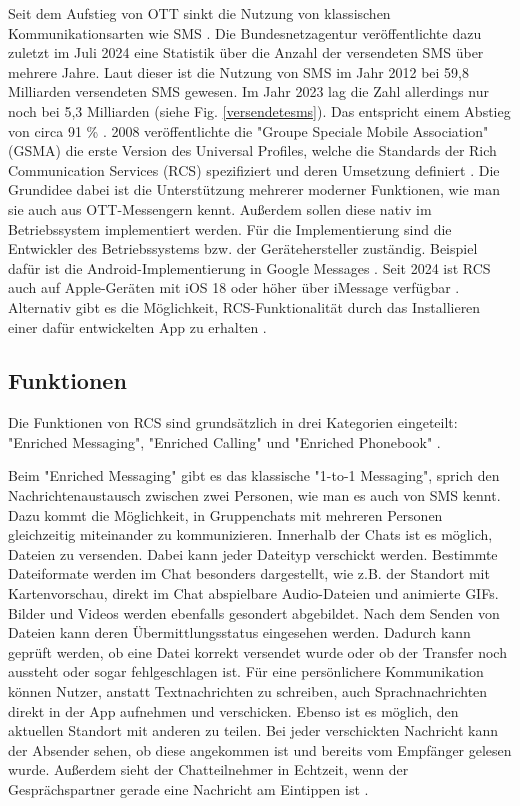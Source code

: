 \documentclass[conference]{IEEEtran}
\begin{document}
Seit dem Aufstieg von OTT sinkt die Nutzung von klassischen Kommunikationsarten wie SMS \cite{ottmobinter}.
Die Bundesnetzagentur veröffentlichte dazu zuletzt im Juli 2024 eine Statistik über die Anzahl der versendeten SMS über mehrere Jahre.
Laut dieser ist die Nutzung von SMS im Jahr 2012 bei 59,8 Milliarden versendeten SMS gewesen.
Im Jahr 2023 lag die Zahl allerdings nur noch bei 5,3 Milliarden (siehe Fig. \ref{versendetesms}).
Das entspricht einem Abstieg von circa 91 \% \cite{smsstats}.
2008 veröffentlichte die "Groupe Speciale Mobile Association" (GSMA) die erste Version des Universal Profiles, welche die Standards der Rich Communication Services (RCS) spezifiziert und deren Umsetzung definiert \cite{rcsuite}.
Die Grundidee dabei ist die Unterstützung mehrerer moderner Funktionen, wie man sie auch aus OTT-Messengern kennt.
Außerdem sollen diese nativ im Betriebssystem implementiert werden.
Für die Implementierung sind die Entwickler des Betriebssystems bzw. der Gerätehersteller zuständig.
Beispiel dafür ist die Android-Implementierung in Google Messages \cite{googlemessages}.
Seit 2024 ist RCS auch auf Apple-Geräten mit iOS 18 oder höher über iMessage verfügbar \cite{applemessages}.
Alternativ gibt es die Möglichkeit, RCS-Funktionalität durch das Installieren einer dafür entwickelten App zu erhalten \cite{uniprof}.

\subsection{Funktionen}

Die Funktionen von RCS sind grundsätzlich in drei Kategorien eingeteilt: "Enriched Messaging", "Enriched Calling" und "Enriched Phonebook" \cite{rcsuite,uniprof}.

Beim "Enriched Messaging" gibt es das klassische "1-to-1 Messaging", sprich den Nachrichtenaustausch zwischen zwei Personen, wie man es auch von SMS kennt.
Dazu kommt die Möglichkeit, in Gruppenchats mit mehreren Personen gleichzeitig miteinander zu kommunizieren.
Innerhalb der Chats ist es möglich, Dateien zu versenden.
Dabei kann jeder Dateityp verschickt werden. Bestimmte Dateiformate werden im Chat besonders dargestellt, wie z.B. der Standort mit Kartenvorschau, direkt im Chat abspielbare Audio-Dateien und animierte GIFs.
Bilder und Videos werden ebenfalls gesondert abgebildet.
Nach dem Senden von Dateien kann deren Übermittlungsstatus eingesehen werden.
Dadurch kann geprüft werden, ob eine Datei korrekt versendet wurde oder ob der Transfer noch aussteht oder sogar fehlgeschlagen ist.
Für eine persönlichere Kommunikation können Nutzer, anstatt Textnachrichten zu schreiben, auch Sprachnachrichten direkt in der App aufnehmen und verschicken.
Ebenso ist es möglich, den aktuellen Standort mit anderen zu teilen.
Bei jeder verschickten Nachricht kann der Absender sehen, ob diese angekommen ist und bereits vom Empfänger gelesen wurde.
Außerdem sieht der Chatteilnehmer in Echtzeit, wenn der Gesprächspartner gerade eine Nachricht am Eintippen ist \cite{uniprof}.
\end{document}
